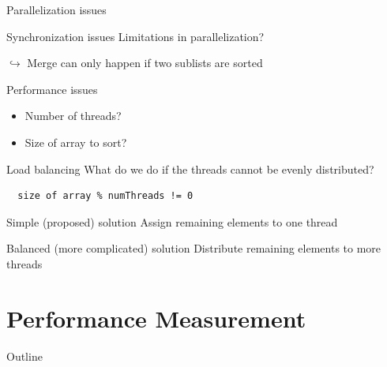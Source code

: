 \begin{frame}{Parallelization issues}
  \begin{block}{Synchronization issues}
    Limitations in parallelization?

    $\hookrightarrow$ Merge can only happen if two sublists are sorted
  \end{block}


  \begin{block}{Performance issues}
    \begin{itemize}
    \item Number of threads?
    \item Size of array to sort?
    \end{itemize}
  \end{block}
\end{frame}

\begin{frame}[fragile]{Load balancing}
  What do we do if the threads cannot be evenly distributed?
  
\begin{lstlisting}
  size of array % numThreads != 0
\end{lstlisting}


  \begin{exampleblock}{Simple (proposed) solution}
    Assign remaining elements to one thread
  \end{exampleblock}


  \begin{exampleblock}{Balanced (more complicated) solution}
    Distribute remaining elements to more threads
  \end{exampleblock}
\end{frame}


\section{Performance Measurement}

\begin{frame}{Outline}
  \tableofcontents[current]
\end{frame}

